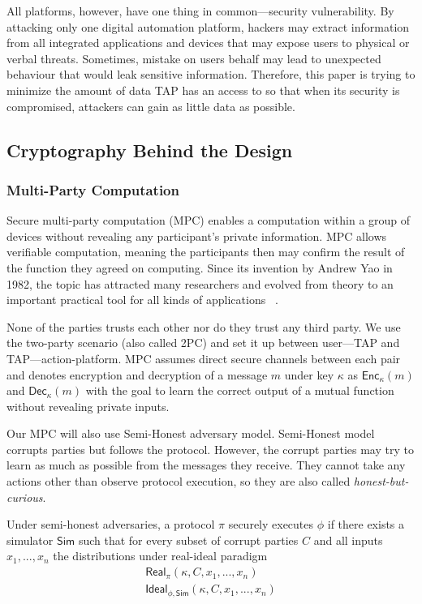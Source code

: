 All platforms, however, have one thing in common---security vulnerability. By attacking only one digital
automation platform, hackers may extract information from all integrated applications and devices that
may expose users to physical or verbal threats. Sometimes, mistake on users behalf may lead to
unexpected behaviour that would leak sensitive information. Therefore, this paper is trying to minimize
the amount of data TAP has an access to so that when its security is compromised, attackers can gain as
little data as possible.


\subsection{Cryptography Behind the Design}

\subsubsection{Multi-Party Computation}

Secure multi-party computation (MPC) enables a computation within a group of devices without revealing
any participant's private information. MPC allows verifiable computation, meaning the participants then
may confirm the result of the function they agreed on computing. Since its invention by Andrew Yao in
1982, the topic has attracted many researchers and evolved from theory to an important practical tool for
all kinds of applications ~\cite{DBLP:journals/ftsec/EvansKR18}. 

None of the parties trusts each other nor do they trust any third party. We use the two-party scenario
(also called 2PC) and set it up between user---TAP and TAP---action-platform. MPC assumes direct
secure channels between each pair and denotes encryption and decryption of a message $m$ under key
$\kappa$ as $\mathsf{Enc}_\kappa(m)$ and $\mathsf{Dec}_\kappa(m)$ with the goal to learn the correct
output of a mutual function without revealing private inputs. 

Our MPC will also use Semi-Honest adversary model. Semi-Honest model corrupts parties but follows
the protocol. However, the corrupt parties may try to learn as much as possible from the messages they
receive. They cannot take any actions other than observe protocol execution, so they are also called
\emph{honest-but-curious}. 

Under semi-honest adversaries, a protocol $\pi$ securely executes $\phi$ if there exists a simulator 
$\mathsf{Sim}$ such that for every subset of corrupt parties $C$ and all inputs $x_1, ..., x_n$ the
distributions under real-ideal paradigm 
\begin{gather*}
  \mathsf{Real}_{\pi}(\kappa, C, x_1, ..., x_n) \\
  \mathsf{Ideal}_{\phi, \mathsf{Sim}} (\kappa, C, x_1, ..., x_n)
\end{gather*} 

